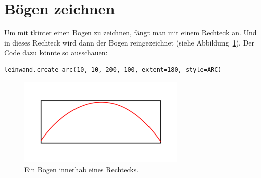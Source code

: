 \section{Bögen zeichnen}

Um mit tkinter einen Bogen zu zeichnen, fängt man mit einem Rechteck an. Und in dieses Rechteck wird dann der Bogen reingezeichnet (siehe Abbildung~\ref{fig36}). Der Code dazu könnte so ausschauen:

\begin{Verbatim}[frame=single]
leinwand.create_arc(10, 10, 200, 100, extent=180, style=ARC)
\end{Verbatim}

\begin{figure}
\begin{center}
\includegraphics[width=80mm]{images/figure36}
\end{center}
\caption{Ein Bogen innerhab eines Rechtecks.}\label{fig36}
\end{figure}

